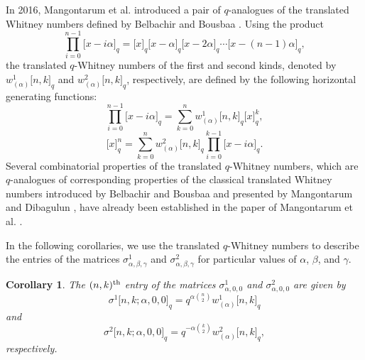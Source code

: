 \documentclass[12pt]{article}
\newtheorem{cor}[thm]{Corollary}
\begin{document}
In 2016, Mangontarum et al. \cite{Mangontarum4} introduced a pair of $q$-analogues of the translated Whitney numbers defined by Belbachir and Bousbaa \cite{Bel}. Using the product
\begin{equation}
	\prod_{i=0}^{n-1}\big[x-i\alpha\big]_q=\big[x\big]_q\big[x-\alpha\big]_q\big[x-2\alpha\big]_q\cdots\big[x-(n-1)\alpha\big]_q,
\end{equation}
the translated $q$-Whitney numbers of the first and second kinds, denoted by
$w^1_{(\alpha)}\big[n,k\big]_q$ and
$w^2_{(\alpha)}\big[n,k\big]_q$, respectively, are defined by the following horizontal generating functions:
\begin{equation}
	\prod_{i=0}^{n-1}\big[x-i\alpha\big]_q=\sum_{k=0}^nw^1_{(\alpha)}\big[n,k\big]_q\big[x\big]_q^k,\label{transqfirst}
\end{equation}
\begin{equation}
	\big[x\big]_q^n=\sum_{k=0}^nw^2_{(\alpha)}\big[n,k\big]_q\prod_{i=0}^{k-1}\big[x-i\alpha\big]_q.\label{transqsecond}
\end{equation}
Several combinatorial properties of the translated $q$-Whitney numbers, which are $q$-analogues of corresponding properties of the classical translated Whitney numbers introduced by Belbachir and Bousbaa \cite{Bel} and presented by Mangontarum and Dibagulun \cite{Mangontarum3}, have already been established in the paper of Mangontarum et al. \cite{Mangontarum4}.

In the following corollaries, we use the translated $q$-Whitney numbers to describe the entries of the matrices
$\sigma^1_{\alpha,\beta,\gamma}$ and
$\sigma^2_{\alpha,\beta,\gamma}$
for particular values of $\alpha$, $\beta$, and $\gamma$.

\begin{cor}\label{thm3} 
	The $(n,k)^{\rm th}$ entry of the matrices $\sigma^1_{\alpha,0,0}$ and $\sigma^2_{\alpha,0,0}$ are given by
	\begin{equation}
	\sigma^1\big[n,k;\alpha,0,0\big]_q=q^{\alpha\binom{n}{2}}w_{(\alpha)}^{1}\big[n,k\big]_q\label{result5}
	\end{equation}
	and
	\begin{equation}
	\sigma^2\big[n,k;\alpha,0,0\big]_q=q^{-\alpha\binom{k}{2}}w_{(\alpha)}^{2}\big[n,k\big]_q,\label{result6}
	\end{equation}
	respectively.
\end{cor}
\end{document}
